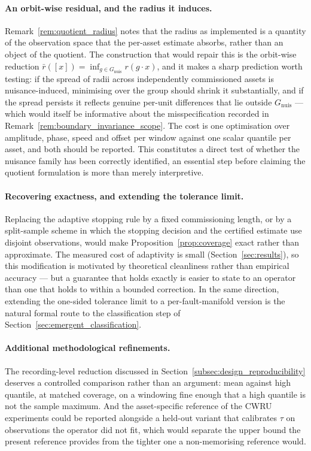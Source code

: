 \documentclass[a4paper]{cas-sc}
\newcommand{\Gnuis}{\ensuremath{G_{\mathrm{nuis}}}}
\begin{document}
\paragraph{An orbit-wise residual, and the radius it induces.}
Remark~\ref{rem:quotient_radius} notes that the radius as implemented is a
quantity of the observation space that the per-asset estimate absorbs, rather
than an object of the quotient. The construction that would repair this is the
orbit-wise reduction \(\bar r([x]) = \inf_{g \in \Gnuis} r(g\cdot x)\), and it
makes a sharp prediction worth testing: if the spread of radii across
independently commissioned assets is nuisance-induced, minimising over the
group should shrink it substantially, and if the spread persists it reflects
genuine per-unit differences that lie outside \(\Gnuis\) --- which would itself
be informative about the misspecification recorded in
Remark~\ref{rem:boundary_invariance_scope}. The cost is one optimisation over
amplitude, phase, speed and offset per window against one scalar quantile per
asset, and both should be reported. This constitutes a direct test of
whether the nuisance family has been correctly identified, an essential step
before claiming the quotient formulation is more than merely interpretive.

\paragraph{Recovering exactness, and extending the tolerance limit.}
Replacing the adaptive stopping rule by a fixed commissioning length, or by a
split-sample scheme in which the stopping decision and the certified estimate
use disjoint observations, would make Proposition~\ref{prop:coverage} exact
rather than approximate. The measured cost of adaptivity is small
(Section~\ref{sec:results}), so this modification is motivated by theoretical cleanliness
rather than empirical accuracy --- but a guarantee that holds exactly is easier to state to an
operator than one that holds to within a bounded correction. In the same
direction, extending the one-sided tolerance limit to a per-fault-manifold
version is the natural formal route to the classification step of
Section~\ref{sec:emergent_classification}.

\paragraph{Additional methodological refinements.}
The recording-level reduction discussed in
Section~\ref{subsec:design_reproducibility} deserves a controlled comparison
rather than an argument: mean against high quantile, at matched coverage, on
a windowing fine enough that a high quantile is not the sample maximum. And
the asset-specific reference of the CWRU experiments could be reported
alongside a held-out variant that calibrates \(\tau\) on observations the
operator did not fit, which would separate the upper bound the present
reference provides from the tighter one a non-memorising reference would.
\end{document}
